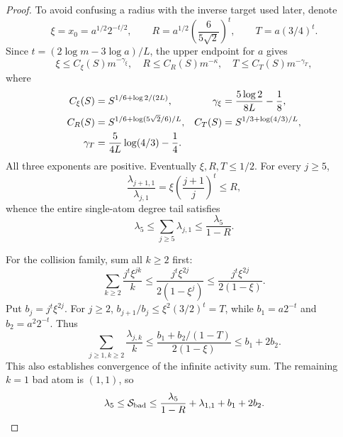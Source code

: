 \documentclass[11pt,letterpaper]{article}
\numberwithin{equation}{section}
\theoremstyle{definition}\newtheorem{definition}[theorem]{Definition}
\theoremstyle{remark}\newtheorem{remark}[theorem]{Remark}
\begin{document}
\begin{proof}
To avoid confusing a radius with the inverse target used later, denote
\[
 \xi=x_0=a^{1/2}2^{-t/2},\qquad
 R=a^{1/2}\left(\frac6{5\sqrt2}\right)^t,\qquad
 T=a(3/4)^t.
\]
Since $t=(2\log m-3\log a)/L$, the upper endpoint for $a$ gives
\begin{equation}\label{det:grow:eq:radiusbounds}
 \xi\le C_\xi(S)m^{-\gamma_\xi},\quad
 R\le C_R(S)m^{-\kappa},\quad
 T\le C_T(S)m^{-\gamma_T},
\end{equation}
where
\begin{align}\label{det:grow:eq:radiusconstants}
 C_\xi(S)&=S^{1/6+\log2/(2L)},&
 \gamma_\xi&=\frac{5\log2}{8L}-\frac18,\\
 C_R(S)&=S^{1/6+\log(5\sqrt2/6)/L},&
 C_T(S)&=S^{1/3+\log(4/3)/L},\notag\\
 \gamma_T&=\frac5{4L}\log(4/3)-\frac14.&&\notag
\end{align}
All three exponents are positive. Eventually $\xi,R,T\le1/2$.
For every $j\ge5$,
\[
 \frac{\lambda_{j+1,1}}{\lambda_{j,1}}
 =\xi\left(\frac{j+1}{j}\right)^t\le R,
\]
whence the entire single-atom degree tail satisfies
\begin{equation}\label{det:grow:eq:jtail}
 \lambda_5\le\sum_{j\ge5}\lambda_{j,1}\le\frac{\lambda_5}{1-R}.
\end{equation}

For the collision family, sum all $k\ge2$ first:
\[
 \sum_{k\ge2}\frac{j^t\xi^{jk}}k
 \le\frac{j^t\xi^{2j}}{2(1-\xi^j)}
 \le\frac{j^t\xi^{2j}}{2(1-\xi)}.
\]
Put $b_j=j^t\xi^{2j}$. For $j\ge2$,
$b_{j+1}/b_j\le\xi^2(3/2)^t=T$, while
$b_1=a2^{-t}$ and $b_2=a^2 2^{-t}$. Thus
\begin{equation}\label{det:grow:eq:ktail}
 \sum_{j\ge1,k\ge2}\frac{\lambda_{j,k}}k
 \le\frac{b_1+b_2/(1-T)}{2(1-\xi)}\le b_1+2b_2.
\end{equation}
This also establishes convergence of the infinite activity sum. The
remaining $k=1$ bad atom is $(1,1)$, so
\begin{equation}\label{det:grow:eq:operational}
 \lambda_5\le\mathcal S_{\rm bad}
 \le\frac{\lambda_5}{1-R}+\lambda_{1,1}+b_1+2b_2.
\end{equation}


\end{proof}
\end{document}
